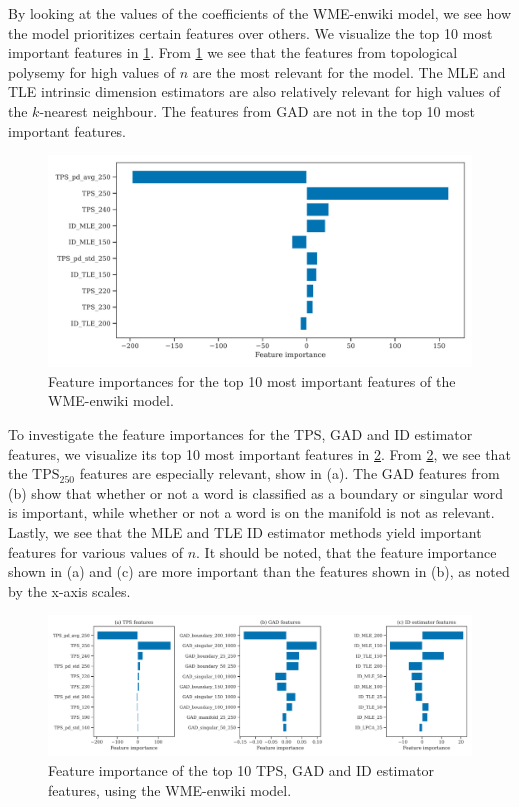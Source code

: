 By looking at the values of the coefficients of the WME-enwiki model, we see how the model prioritizes certain features over others. We visualize the top 10 most important features in \cref{fig:wme-enwiki-feature-importances}. From \cref{fig:wme-enwiki-feature-importances} we see that the features from topological polysemy for high values of $n$ are the most relevant for the model. The MLE and TLE intrinsic dimension estimators are also relatively relevant for high values of the $k$-nearest neighbour. The features from GAD are not in the top 10 most important features.
\begin{figure}[H]
    \centering
    \includegraphics[width=\textwidth]{thesis/figures/wme-enwiki-top-10-feature-importances.pdf}
    \caption{Feature importances for the top 10 most important features of the WME-enwiki model.}
    \label{fig:wme-enwiki-feature-importances}
\end{figure}

To investigate the feature importances for the TPS, GAD and ID estimator features, we visualize its top 10 most important features in \cref{fig:wme-enwiki-feature-importances-tps-gad-estimated-ids}. From \cref{fig:wme-enwiki-feature-importances-tps-gad-estimated-ids}, we see that the $\text{TPS}_{250}$ features are especially relevant, show in (a). The GAD features from (b) show that whether or not a word is classified as a boundary or singular word is important, while whether or not a word is on the manifold is not as relevant. Lastly, we see that the MLE and TLE ID estimator methods yield important features for various values of $n$. It should be noted, that the feature importance shown in (a) and (c) are more important than the features shown in (b), as noted by the x-axis scales.
\begin{figure}[H]
    \centering
    \includegraphics[width=\textwidth]{thesis/figures/wme-enwiki-top-10-feature-importances-tps-gad-estimated-ids.pdf}
    \caption{Feature importance of the top 10 TPS, GAD and ID estimator features, using the WME-enwiki model.}
    \label{fig:wme-enwiki-feature-importances-tps-gad-estimated-ids}
\end{figure}

